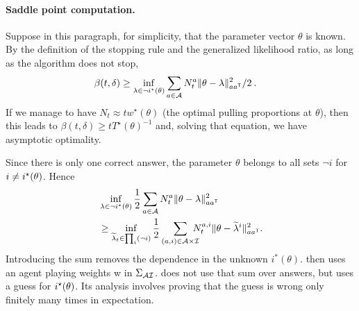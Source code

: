 \paragraph{Saddle point computation.}
Suppose in this paragraph, for simplicity, that the parameter vector $\theta$ is known. By the definition of the stopping rule and the generalized likelihood ratio, as long as the algorithm does not stop,
\begin{align*}
\beta(t,\delta)
&\ge \inf_{\lambda\in \neg i^\star(\theta)} \sum_{a\in \mathcal{A}} N_t^a \Vert \theta - \lambda \Vert^2_{a a^{\mathsf{\scriptscriptstyle T}}}/2 \: .
\end{align*}
If we manage to have $N_t \approx t w^\star(\theta)$ (the optimal pulling proportions at $\theta$), then this leads to $\beta(t,\delta) \ge t T^\star(\theta)^{-1}$ and, solving that equation, we have asymptotic optimality.

Since there is only one correct answer, the parameter $\theta$ belongs to all sets $\neg i$ for $i\neq i^\star(\theta)$. Hence
\begin{align*}
&\inf_{\lambda\in \neg i^\star(\theta)}\frac{1}{2} \sum_{a\in \mathcal{A}} N_t^a \Vert \theta - \lambda \Vert^2_{a a^{\mathsf{\scriptscriptstyle T}}}
\\&\geq \inf_{\widetilde{\lambda}_t\in \prod_i (\neg i)}\frac{1}{2}\sum_{(a,i)\in \mathcal{A}\times\mathcal{I}}\!\!\!\!\! N_t^{a,i} \Vert \theta - \widetilde{\lambda}^i \Vert^2_{a a^{\mathsf{\scriptscriptstyle T}}}.
\end{align*} Introducing the sum removes the dependence in the unknown $i^*(\theta)$. \LGC then uses an agent playing weights w in $\Sigma_{\mathcal{A}\mathcal{I}}$. \LG does not use that sum over answers, but uses a guess for $i^\star(\theta)$. Its analysis involves proving that the guess is wrong only finitely many times in expectation.

